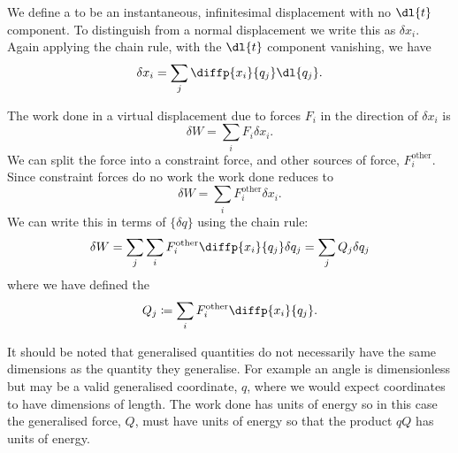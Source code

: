 \documentclass[fleqn]{NotesClass}
\newcommand*{\other}{\mathrm{other}}
\begin{document}
    We define a  to be an instantaneous, infinitesimal displacement with no \(\dl{t}\) component.
    To distinguish from a normal displacement we write this as \(\delta x_i\).
    Again applying the chain rule, with the \(\dl{t}\) component vanishing, we have
    \begin{equation}
        \delta x_i = \sum_j \diffp{x_i}{q_j}\dl{q_j}.
    \end{equation}
    
    The work done in a virtual displacement due to forces \(F_i\) in the direction of \(\delta x_i\) is
    \begin{equation}
        \delta W = \sum_i F_i\delta x_i.
    \end{equation}
    We can split the force into a constraint force, and other sources of force, \(F_i^{\other}\).
    Since constraint forces do no work the work done reduces to
    \begin{equation}
        \delta W = \sum_{i} F_{i}^{\other} \delta x_i.
    \end{equation}
    We can write this in terms of \(\{\delta q\}\) using the chain rule:
    \begin{equation}
        \delta W = \sum_j \sum_i F_i^{\other} \diffp{x_i}{q_j}\delta q_j = \sum_j Q_j \delta q_j
    \end{equation}
    where we have defined the 
    \begin{equation}
        Q_j \coloneqq \sum_{i}F_i^{\other} \diffp{x_i}{q_j}.
    \end{equation}
    
    It should be noted that generalised quantities do not necessarily have the same dimensions as the quantity they generalise.
    For example an angle is dimensionless but may be a valid generalised coordinate, \(q\), where we would expect coordinates to have dimensions of length.
    The work done has units of energy so in this case the generalised force, \(Q\), must have units of energy so that the product \(qQ\) has units of energy.
    
\end{document}
